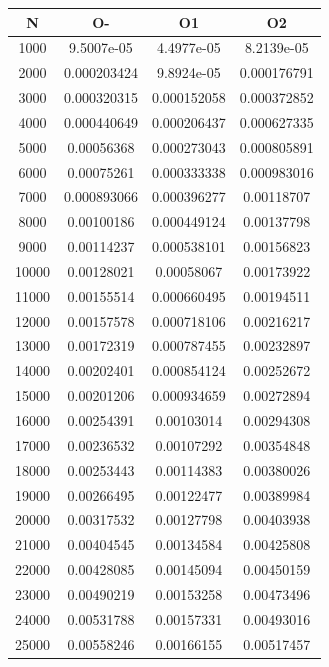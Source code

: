 \begin{center}
\begin{tabular}{| c | c | c | c |}
\hline
\textbf{N} & \textbf{O-} & \textbf{O1} & \textbf{O2} \\ \hline
1000 & 9.5007e-05 & 4.4977e-05 & 8.2139e-05 \\ \hline
2000 & 0.000203424 & 9.8924e-05 & 0.000176791 \\ \hline
3000 & 0.000320315 & 0.000152058 & 0.000372852 \\ \hline
4000 & 0.000440649 & 0.000206437 & 0.000627335 \\ \hline
5000 & 0.00056368 & 0.000273043 & 0.000805891 \\ \hline
6000 & 0.00075261 & 0.000333338 & 0.000983016 \\ \hline
7000 & 0.000893066 & 0.000396277 & 0.00118707 \\ \hline
8000 & 0.00100186 & 0.000449124 & 0.00137798 \\ \hline
9000 & 0.00114237 & 0.000538101 & 0.00156823 \\ \hline
10000 & 0.00128021 & 0.00058067 & 0.00173922 \\ \hline
11000 & 0.00155514 & 0.000660495 & 0.00194511 \\ \hline
12000 & 0.00157578 & 0.000718106 & 0.00216217 \\ \hline
13000 & 0.00172319 & 0.000787455 & 0.00232897 \\ \hline
14000 & 0.00202401 & 0.000854124 & 0.00252672 \\ \hline
15000 & 0.00201206 & 0.000934659 & 0.00272894 \\ \hline
16000 & 0.00254391 & 0.00103014 & 0.00294308 \\ \hline
17000 & 0.00236532 & 0.00107292 & 0.00354848 \\ \hline
18000 & 0.00253443 & 0.00114383 & 0.00380026 \\ \hline
19000 & 0.00266495 & 0.00122477 & 0.00389984 \\ \hline
20000 & 0.00317532 & 0.00127798 & 0.00403938 \\ \hline
21000 & 0.00404545 & 0.00134584 & 0.00425808 \\ \hline
22000 & 0.00428085 & 0.00145094 & 0.00450159 \\ \hline
23000 & 0.00490219 & 0.00153258 & 0.00473496 \\ \hline
24000 & 0.00531788 & 0.00157331 & 0.00493016 \\ \hline
25000 & 0.00558246 & 0.00166155 & 0.00517457 \\ \hline

\end{tabular}
\end{center}
